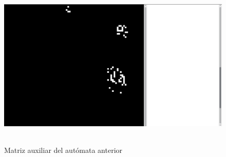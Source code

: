 \documentclass[12pt, titlepage]{article}
\begin{document}
\begin{figure}[H]
\begin{center}
 \includegraphics[width=15cm, height=8cm]{./img/2746-paridad-aux.png}
 \caption{Matriz auxiliar del autómata anterior}
 \label{fig:2746-paridad-aux}
\end{center}
\end{figure}
\end{document}
